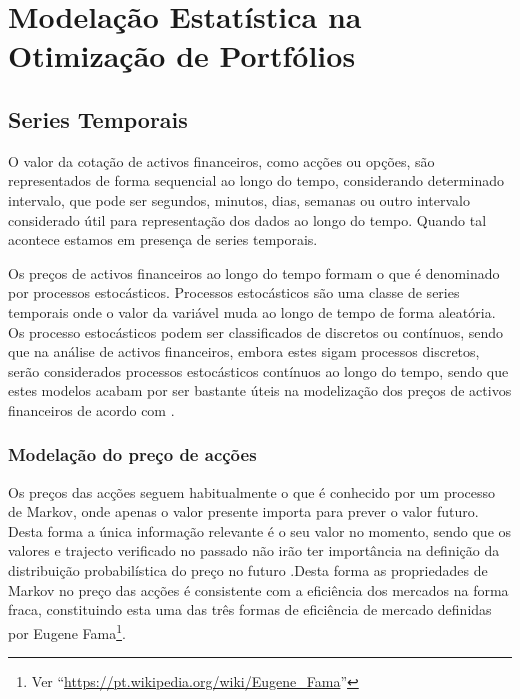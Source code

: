 \documentclass[
  12pt,
  a4paper,
  openany]{book}
\begin{document}
\begingroup
\titleformat{\chapter}[display]
{\normalfont\huge\bfseries\centering}{\chaptertitlename\ \thechapter}{20pt}{\Huge}

\hypertarget{modelauxe7uxe3o-estatuxedstica-na-otimizauxe7uxe3o-de-portfuxf3lios}{%
\chapter{Modelação Estatística na Otimização de Portfólios}\label{modelauxe7uxe3o-estatuxedstica-na-otimizauxe7uxe3o-de-portfuxf3lios}}

\newpage

\hypertarget{series-temporais}{%
\section{Series Temporais}\label{series-temporais}}

O valor da cotação de activos financeiros, como acções ou opções, são representados de forma sequencial ao longo do tempo, considerando determinado intervalo, que pode ser segundos, minutos, dias, semanas ou outro intervalo considerado útil para representação dos dados ao longo do tempo. Quando tal acontece estamos em presença de series temporais.

Os preços de activos financeiros ao longo do tempo formam o que é denominado por processos estocásticos. Processos estocásticos são uma classe de series temporais onde o valor da variável muda ao longo de tempo de forma aleatória. Os processo estocásticos podem ser classificados de discretos ou contínuos, sendo que na análise de activos financeiros, embora estes sigam processos discretos, serão considerados processos estocásticos contínuos ao longo do tempo, sendo que estes modelos acabam por ser bastante úteis na modelização dos preços de activos financeiros de acordo com \citet{Hull2018}.

\hypertarget{modelauxe7uxe3o-do-preuxe7o-de-acuxe7uxf5es}{%
\subsection{Modelação do preço de acções}\label{modelauxe7uxe3o-do-preuxe7o-de-acuxe7uxf5es}}

Os preços das acções seguem habitualmente o que é conhecido por um processo de Markov, onde apenas o valor presente importa para prever o valor futuro. Desta forma a única informação relevante é o seu valor no momento, sendo que os valores e trajecto verificado no passado não irão ter importância na definição da distribuição probabilística do preço no futuro \citep{Hull2018}.Desta forma as propriedades de Markov no preço das acções é consistente com a eficiência dos mercados na forma fraca, constituindo esta uma das três formas de eficiência de mercado definidas por Eugene Fama\footnote{Ver ``\url{https://pt.wikipedia.org/wiki/Eugene_Fama}''}.
\end{document}
